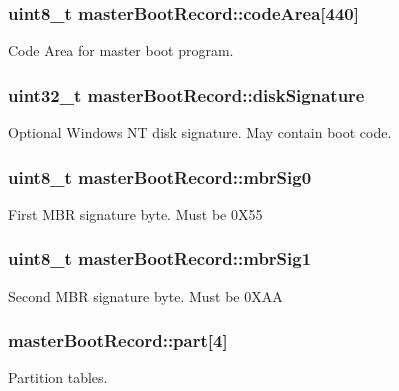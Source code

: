 \subsubsection[{\texorpdfstring{code\+Area}{codeArea}}]{\setlength{\rightskip}{0pt plus 5cm}uint8\+\_\+t master\+Boot\+Record\+::code\+Area\mbox{[}440\mbox{]}}\hypertarget{structmaster_boot_record_a26ca1fb4ebbff2cc1a54153b1dfcd688}{}\label{structmaster_boot_record_a26ca1fb4ebbff2cc1a54153b1dfcd688}
Code Area for master boot program. 
\subsubsection[{\texorpdfstring{disk\+Signature}{diskSignature}}]{\setlength{\rightskip}{0pt plus 5cm}uint32\+\_\+t master\+Boot\+Record\+::disk\+Signature}\hypertarget{structmaster_boot_record_a77151c641444c0653ff71a253f0423ef}{}\label{structmaster_boot_record_a77151c641444c0653ff71a253f0423ef}
Optional Windows NT disk signature. May contain boot code. 
\subsubsection[{\texorpdfstring{mbr\+Sig0}{mbrSig0}}]{\setlength{\rightskip}{0pt plus 5cm}uint8\+\_\+t master\+Boot\+Record\+::mbr\+Sig0}\hypertarget{structmaster_boot_record_a42b0b413ecb21ac5314d4f6bca05308f}{}\label{structmaster_boot_record_a42b0b413ecb21ac5314d4f6bca05308f}
First M\+BR signature byte. Must be 0\+X55 
\subsubsection[{\texorpdfstring{mbr\+Sig1}{mbrSig1}}]{\setlength{\rightskip}{0pt plus 5cm}uint8\+\_\+t master\+Boot\+Record\+::mbr\+Sig1}\hypertarget{structmaster_boot_record_aafbbcb4f6a2d1181c6458d4c9603df4f}{}\label{structmaster_boot_record_aafbbcb4f6a2d1181c6458d4c9603df4f}
Second M\+BR signature byte. Must be 0\+X\+AA 
\subsubsection[{\texorpdfstring{part}{part}}]{ master\+Boot\+Record\+::part\mbox{[}4\mbox{]}}\hypertarget{structmaster_boot_record_aa4e294e50f311635c10c92f4c99227c5}{}\label{structmaster_boot_record_aa4e294e50f311635c10c92f4c99227c5}
Partition tables. 
